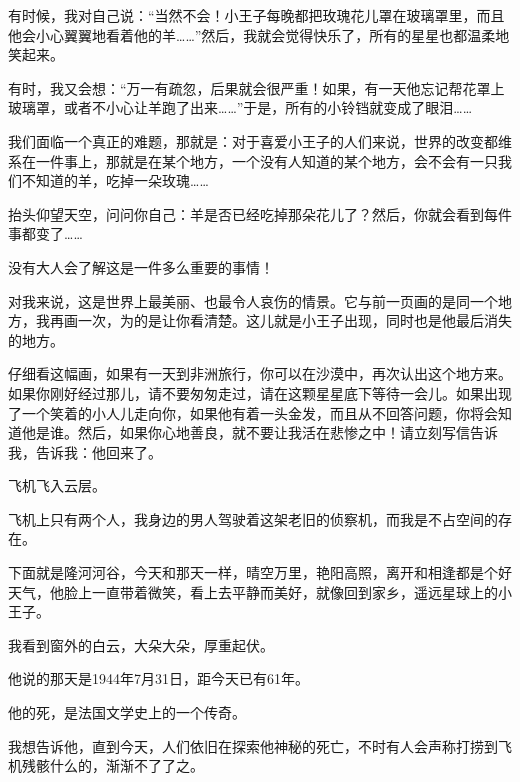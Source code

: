 有时候，我对自己说：“当然不会！小王子每晚都把玫瑰花儿罩在玻璃罩里，而且他会小心翼翼地看着他的羊\ldots{}\ldots{}”然后，我就会觉得快乐了，所有的星星也都温柔地笑起来。

有时，我又会想：“万一有疏忽，后果就会很严重！如果，有一天他忘记帮花罩上玻璃罩，或者不小心让羊跑了出来\ldots{}\ldots{}”于是，所有的小铃铛就变成了眼泪\ldots{}\ldots{}

我们面临一个真正的难题，那就是：对于喜爱小王子的人们来说，世界的改变都维系在一件事上，那就是在某个地方，一个没有人知道的某个地方，会不会有一只我们不知道的羊，吃掉一朵玫瑰\ldots{}\ldots{}

抬头仰望天空，问问你自己：羊是否已经吃掉那朵花儿了？然后，你就会看到每件事都变了\ldots{}\ldots{}

没有大人会了解这是一件多么重要的事情！

对我来说，这是世界上最美丽、也最令人哀伤的情景。它与前一页画的是同一个地方，我再画一次，为的是让你看清楚。这儿就是小王子出现，同时也是他最后消失的地方。

仔细看这幅画，如果有一天到非洲旅行，你可以在沙漠中，再次认出这个地方来。如果你刚好经过那儿，请不要匆匆走过，请在这颗星星底下等待一会儿。如果出现了一个笑着的小人儿走向你，如果他有着一头金发，而且从不回答问题，你将会知道他是谁。然后，如果你心地善良，就不要让我活在悲惨之中！请立刻写信告诉我，告诉我：他回来了。

{\startalignment[center]
 \setupcaption[textfig][location={bottom,center},width=\textwidth]
 \stopalignment}

\stoptitle
\stopbodymatter

\starttitle[title={1}]

飞机飞入云层。

飞机上只有两个人，我身边的男人驾驶着这架老旧的侦察机，而我是不占空间的存在。

下面就是隆河河谷，今天和那天一样，晴空万里，艳阳高照，离开和相逢都是个好天气，他脸上一直带着微笑，看上去平静而美好，就像回到家乡，遥远星球上的小王子。

我看到窗外的白云，大朵大朵，厚重起伏。

他说的那天是1944年7月31日，距今天已有61年。

他的死，是法国文学史上的一个传奇。

我想告诉他，直到今天，人们依旧在探索他神秘的死亡，不时有人会声称打捞到飞机残骸什么的，渐渐不了了之。


